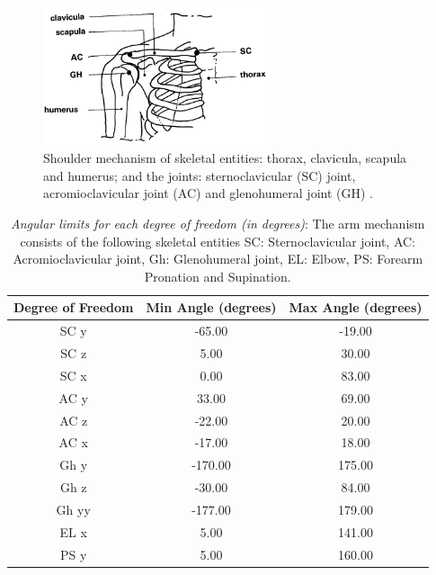 \begin{figure}[h!]
    \centering
    \includegraphics[width=0.6\textwidth]{Pictures/DAS/Joints.png}
    \caption{Shoulder mechanism of skeletal entities: thorax, clavicula, scapula and humerus; and the joints: sternoclavicular (SC) joint, acromioclavicular joint (AC) and glenohumeral joint (GH) \cite{Measuringmuscleandjoint}. }
    \label{fig:measuring}
\end{figure}

\begin{table}[h!]
\centering
\caption {\textit{Angular limits for each degree of freedom (in degrees)}: The arm mechanism consists of the following skeletal entities SC: Sternoclavicular joint, AC: Acromioclavicular joint, Gh: Glenohumeral joint, EL: Elbow, PS: Forearm Pronation and Supination.}
\label{table:11dof}
\begin{tabular}{ccc}
\hline
\textbf{Degree of Freedom} & \textbf{Min Angle (degrees)} & \textbf{Max Angle (degrees)} \\
\hline
SC y & -65.00 & -19.00 \\
SC z & 5.00 & 30.00 \\
SC x & 0.00 & 83.00 \\
AC y & 33.00 & 69.00 \\
AC z & -22.00 & 20.00 \\
AC x & -17.00 & 18.00 \\
Gh y & -170.00 & 175.00 \\
Gh z & -30.00 & 84.00 \\
Gh yy & -177.00 & 179.00 \\
EL x & 5.00 & 141.00 \\
PS y & 5.00 & 160.00 \\
\hline
\end{tabular}

\end{table}

